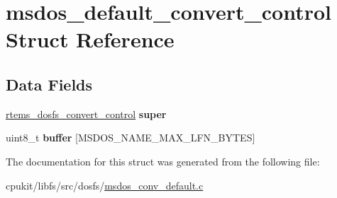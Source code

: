 \hypertarget{structmsdos__default__convert__control}{}\section{msdos\+\_\+default\+\_\+convert\+\_\+control Struct Reference}
\label{structmsdos__default__convert__control}
\subsection*{Data Fields}
\begin{DoxyCompactItemize}
\item 
\mbox{\label{structmsdos__default__convert__control_a22cae95bb91348a81645dd8b56f783a0}} 
\mbox{\hyperlink{structrtems__dosfs__convert__control}{rtems\+\_\+dosfs\+\_\+convert\+\_\+control}} {\bfseries super}
\item 
\mbox{\label{structmsdos__default__convert__control_a9947adb7f535eaa9b66c67f0f9f5be8c}} 
uint8\+\_\+t {\bfseries buffer} \mbox{[}M\+S\+D\+O\+S\+\_\+\+N\+A\+M\+E\+\_\+\+M\+A\+X\+\_\+\+L\+F\+N\+\_\+\+B\+Y\+T\+ES\mbox{]}
\end{DoxyCompactItemize}


The documentation for this struct was generated from the following file\+:\begin{DoxyCompactItemize}
\item 
cpukit/libfs/src/dosfs/\mbox{\hyperlink{msdos__conv__default_8c}{msdos\+\_\+conv\+\_\+default.\+c}}\end{DoxyCompactItemize}
